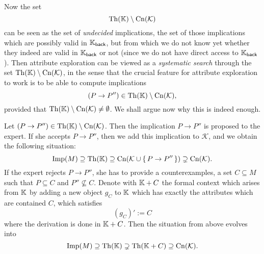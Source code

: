 Now the set
\begin{equation*}
  \operatorname{Th}({\mathbb{K}}) \setminus \operatorname{Cn}(\mathcal{K})
\end{equation*}
can be seen as the set of \emph{undecided} implications, \ie the set of those implications
which are possibly valid in ${\mathbb{K}}_{\mathsf{back}}$, but from which we do not know yet
whether they indeed are valid in ${\mathbb{K}}_{\mathsf{back}}$ or not (since we do not have
direct access to ${\mathbb{K}}_{\mathsf{back}}$).  Then attribute exploration can be viewed as a
\emph{systematic search} through the set $\operatorname{Th}({\mathbb{K}}) \setminus \operatorname{Cn}(\mathcal{K})$, in the
sense that the crucial feature for attribute exploration to work is to be able to compute
implications
\begin{equation}
  \label{eq:33}
  (P \to P'') \in \operatorname{Th}({\mathbb{K}}) \setminus \operatorname{Cn}(\mathcal{K}),
\end{equation}
provided that $\operatorname{Th}({\mathbb{K}}) \setminus \operatorname{Cn}(\mathcal{K}) \neq \emptyset$.  We shall argue now
why this is indeed enough.

Let $(P \to P'') \in \operatorname{Th}({\mathbb{K}}) \setminus \operatorname{Cn}(\mathcal{K})$.  Then the implication $P \to
P''$ is proposed to the expert.  If she accepts $P \to P''$, then we add this implication
to $\mathcal{K}$, and we obtain the following situation:
\begin{equation*}
  \operatorname{Imp}(M) \supseteq \operatorname{Th}({\mathbb{K}}) \supseteq \operatorname{Cn}(\mathcal{K} \cup {\ensuremath{\{\, P \to P'' \,\}}})
  \supsetneq \operatorname{Cn}(\mathcal{K}).
\end{equation*}
If the expert rejects $P \to P''$, she has to provide a counterexamples, \ie a set $C
\subseteq M$ such that $P \subseteq C$ and $P'' \not\subseteq C$.  Denote with ${\mathbb{K}} +
C$ the formal context which arises from ${\mathbb{K}}$ by adding a new object $g_C$ to ${\mathbb{K}}$
which has exactly the attributes which are contained $C$, \ie which satisfies
\begin{equation*}
  (g_C)' := C
\end{equation*}
where the derivation is done in ${\mathbb{K}} + C$.  Then the situation from above evolves into
\begin{equation*}
  \operatorname{Imp}(M) \supseteq \operatorname{Th}({\mathbb{K}}) \supsetneq \operatorname{Th}({\mathbb{K}} + C) \supseteq \operatorname{Cn}(\mathcal{K}).
\end{equation*}

